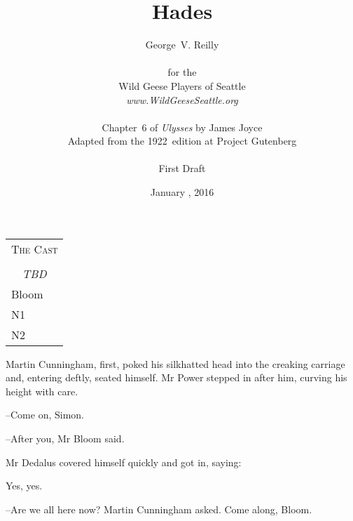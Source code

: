 


\title{\Huge Hades}
\author{George~V. Reilly\\
\\
{\small for the}\\
Wild Geese Players of Seattle\\
{\emph{www.WildGeeseSeattle.org}}\\
\\
{\small Chapter~6 of \emph{Ulysses} by James Joyce}\\
{\small Adapted from the 1922~edition at Project Gutenberg}
\\
\\
{\small First Draft}}
\date{January , 2016}
\raggedbottom



\maketitle
\thispagestyle{empty}
\pagebreak

\begin{tabular}{lp{10cm}}
    \multicolumn{2}{c}{\Large \textsc{The Cast}} \\
\\
    \multicolumn{2}{c}{\large \textit{TBD}} \\
Bloom \\
N1 \\
N2 \\
\end{tabular}

\thispagestyle{empty}
\newpage


\setcounter{page}{1}


Martin Cunningham, first,
poked his silkhatted head into the creaking carriage
and, entering deftly, seated himself.
Mr Power stepped in after him,
curving his height with care.

--Come on, Simon.

--After you,
Mr Bloom said.

Mr Dedalus covered himself quickly and got in, saying:

Yes, yes.

--Are we all here now?
Martin Cunningham asked.
Come along, Bloom.

